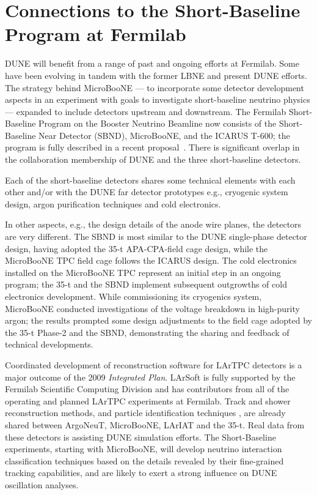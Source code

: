 \section{Connections to the Short-Baseline Program at Fermilab}
\label{sec:sbn_connect}

 
DUNE will benefit from a range of past and ongoing efforts at
Fermilab. Some have been evolving in tandem with the former LBNE and
present DUNE efforts. The strategy behind MicroBooNE --- to
incorporate some detector development aspects in an experiment with
goals to investigate short-baseline neutrino physics --- expanded to
include detectors upstream and downstream.  The Fermilab
Short-Baseline Program on the Booster Neutrino Beamline now consists
of the Short-Baseline Near Detector (SBND), MicroBooNE, and the ICARUS
T-600; the program is fully described in a recent
proposal~\cite{Antonello:2015lea}.  There is significant overlap in
the collaboration membership of DUNE and the three short-baseline
detectors.
 
Each of the short-baseline detectors shares some technical elements with each other and/or with the DUNE far detector prototypes e.g.,   
 cryogenic system design,
 argon purification techniques and
 cold electronics.

In other aspects, e.g., the design details of the anode wire planes, %
the detectors are very different.  The SBND is most similar to the DUNE single-phase detector design, having adopted the 35-t APA-CPA-field cage design, while the MicroBooNE TPC field cage follows the ICARUS design.  The cold electronics installed on the MicroBooNE TPC represent an initial step in an ongoing program; the 35-t and the SBND 
implement subsequent outgrowths of
cold electronics development.  While commissioning its cryogenics system, MicroBooNE conducted investigations of the voltage breakdown in high-purity argon; the results prompted some design adjustments to the field cage adopted by the 35-t Phase-2 and the SBND, demonstrating the sharing and feedback of technical developments.  

Coordinated development of reconstruction software for LArTPC detectors is a major outcome of the 2009 \textit{Integrated Plan}.  LArSoft is fully supported by the Fermilab Scientific Computing Division and has contributors from all of the operating and planned LArTPC experiments at Fermilab.  Track and shower reconstruction methods, and particle identification techniques , are already shared between ArgoNeuT, MicroBooNE, LArIAT and the 35-t.  Real data from these detectors is assisting DUNE simulation efforts.  The Short-Baseline experiments, starting with MicroBooNE, will develop neutrino interaction classification techniques based on the details revealed by their fine-grained tracking capabilities, and are likely to exert a strong influence on DUNE oscillation analyses.



 
